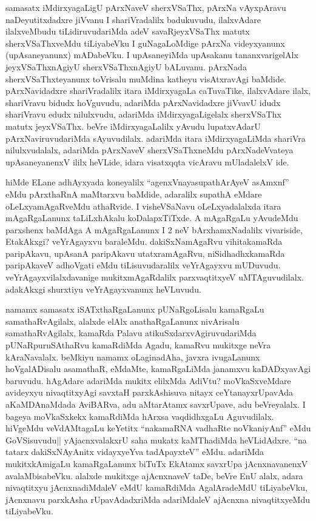 \begin{artha}
samasatx iMdirxyagaLigU pArxNaveV sherxVSaThx, pArxNa vAyxpAravu naDeyutitxdadxre jiVvanu I shariVradalilx badukuvudu, ilalxvAdare ilalxveMbudu tiLidiruvudariMda adeV savaRjeyxVSaThx matutx sherxVSaThxveMdu tiLiyabeVku I guNagaLoMdige pArxNa videyxyanunx (upAsaneyanunx) mADabeVku. I upAsaneyiMda upAsakanu tananxvarigelAlx jeyxVSaThxnAgiyU sherxVSaThxnAgiyU bALuvanu. pArxNada sherxVSaThxteyanunx toVrisalu muMdina katheyu visAtxravAgi baMdide. pArxNavidadxre shariVradalilx itara iMdirxyagaLa caTuvaTike, ilalxvAdare ilalx, shariVravu bidudx hoVguvudu, adariMda pArxNavidadxre jiVvavU idudx shariVravu edudx nilulxvudu, adariMda iMdirxyagaLigelalx sherxVSaThx matutx jeyxVSaThx. beVre iMdirxyagaLalilx yAvudu lupatxvAdarU pArxNaviruvudariMda sAyuvudilalx. adariMda itara iMdirxyagaLiMda shariVra nilulxvudalalx, adariMda pArxNaveV sherxVSaThxneMdu pArxNadeVvateya upAsaneyanenxV ililx heVLide, idara visatxqqta vicAravu mUladalelxV ide.
\end{artha}


\begin{artha}
hiMde ELane adhAyxyada koneyalilx ``agenxVnayasupathArAyeV asAmxnf'' eMdu pArxthaRnA maMtarxvu baMdide, adaralilx supathA eMdare oLeLxyamAgaR\-veMdu athaRvide. I visheVSaNavu oLeLxyadalalxda itara mAgaRgaLanunx taLiLxhAkalu koDalapxTiTxde. A mAgaRgaLu yAvudeMdu parxshenx baMdAga A mAgaRgaLanunx I 2 neV bArxhamxNadalilx vivariside, EtakAkxgi? veYrAgayxvu baraleMdu. dakiSxNamAgaRvu vihitakamaRda paripAkavu, upAsanA paripAkavu utatxramAgaRvu, niSidhadhxkamaRda paripAkaveV adhoVgati eMdu tiLisuvudaralilx veYrAgayxvu mUDuvudu. veYrAgayxvilalxdavanige mukitxmAgaRdalilx parxvaqtitxyeV uMTAguvudilalx. adakAkxgi shurxtiyu veYrAgayxvanunx heVLuvudu.
\end{artha}


\begin{artha}
namamx samasatx iSATxthaRgaLanunx pUNaRgoLisalu kamaRgaLu samathaRvAgilalx, alalxde elAlx anathaRgaLanunx nivArisalu samathaRvAgilalx, kamaRda Palavu atikuSxdarxvAgiruvudariMda pUNaRpuruSAthaRvu kamaRdiMda Agadu, kamaRvu mukitxge neVra kAraNavalalx. beMkiyu namamx oLaginadAha, javxra ivugaLanunx hoVgalADisalu asamathaR, eMdaMte, kamaRgaLiMda janamxvu kaDADxyavAgi baruvudu. hAgAdare adariMda mukitx elilxMda AdiVtu? moVkaSxveMdare avideyxyu nivaqtitxyAgi savxtaH parxkAshisuva nitayx ceYtanayxrUpavAda aKaMDAnaMdada AviBARva, adu aMtarAtamx savxrUpave, adu beVreyalalx. I bageya moVkaSxkekx kamaRdiMda hArxsa vaqdidhxgaLu Aguvudilalx. hiVgeMdu veVdAMtagaLu keYetitx ``nakamaRNA vadhaRte noVkaniyAnf'' eMdu GoVSisuvudu|| yAjacnxvalakxrU saha mukatx kaMThadiMda heVLidAdxre. ``na tatarx dakiSxNAyAnitx vidayxyeYva tadApayxteV'' eMdu. adariMda mukitxkAmigaLu kamaRgaLanunx biTuTx EkAtamx savxrUpa jAcnxnavanenxV avalaMbisabeVku. alalxde mukitxge ajAcnxnaveV taDe, beVre EnU alalx, adara nivaqtitxyu jAcnxnadiMdaleV eMdU kamaRdiMda AgalAradeMdU tiLiyabeVku, jAcnxnavu parxkAsha rUpavAdadxriMda adariMdaleV ajAcnxna nivaqtitxyeMdu tiLiyabeVku.
\end{artha}

